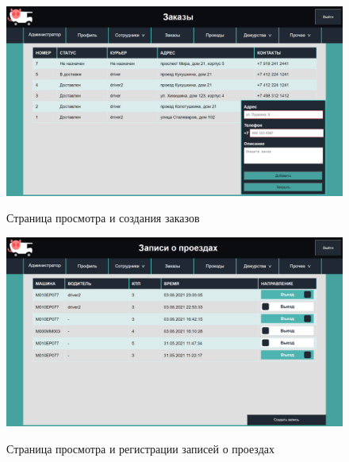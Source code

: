 \begin{figure}[h!] \label{all_delivery_sc}
	\begin{center}
		{\includegraphics[scale=0.43, angle=0]{sc/all_delivery}}
		\caption{Страница просмотра и создания заказов}
	\end{center}
\end{figure}

\begin{figure}[h!] \label{all_pass_sc}
	\begin{center}
		{\includegraphics[scale=0.43, angle=0]{sc/all_pass}}
		\caption{Страница просмотра и регистрации записей о проездах}
	\end{center}
\end{figure}

